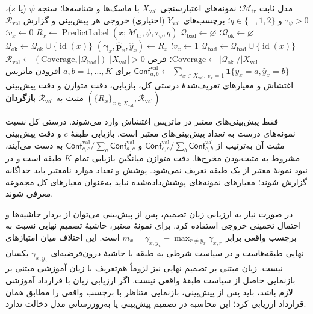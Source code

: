 \begin{algorithm}[!htbp]
\caption{اعتبارسنجی مدل با فراخوانی روند پیش‌بینی برچسب}
\label{cmp:alg:ch3-heldout-validation}
\begin{algorithmic}[1]
\REQUIRE مدل ثابت $\mathcal M_{\mathrm{tr}}$؛
نمونه‌های اعتبارسنجی $X_{\mathrm{val}}$ با ماسک‌ها و شناسه‌ها؛
سنجه $\psi$ (یا $s$)، $\tau_\psi>0$ و $q\in\{\bot,1,2\}$؛
برچسب‌های $Y_{\mathrm{val}}$ (اختیاری)
\ENSURE خروجی هر پیش‌بینی و گزارش $\mathcal R_{\mathrm{val}}$
\STATE $\mathcal Q_{\mathrm{ok}}\gets\varnothing$؛
$\mathcal Q_{\mathrm{bad}}\gets\varnothing$
    \STATE $R_x\gets\operatorname{PredictLabel}
    (x;\mathcal M_{\mathrm{tr}},\psi,\tau_\psi,q)$
        \STATE $v_x\gets0$؛
        $\mathcal Q_{\mathrm{bad}}\gets\mathcal Q_{\mathrm{bad}}\cup\{\operatorname{id}(x)\}$
    \ELSE
        \STATE $v_x\gets1$؛
        $(\boldsymbol\gamma_x,\widehat{\boldsymbol p}_x,\widehat y_x)\gets R_x$
        \STATE $\mathcal Q_{\mathrm{ok}}\gets\mathcal Q_{\mathrm{ok}}\cup\{\operatorname{id}(x)\}$
    \ENDIF
\ENDFOR
\STATE $\mathrm{Coverage}\gets|\mathcal Q_{\mathrm{ok}}|/|X_{\mathrm{val}}|$؛
فرض $|X_{\mathrm{val}}|>0$
\STATE $\mathcal R_{\mathrm{val}}\gets(\mathrm{Coverage},|\mathcal Q_{\mathrm{bad}}|)$
    \STATE $\mathsf{Conf}_{a,b}^{\mathrm{val}}\gets
    \sum_{x\in X_{\mathrm{val}}:\,v_x=1}
    \mathbf1\{y_x=a,\widehat y_x=b\}$
    برای $a,b=1,\ldots,K$
    \STATE افزودن ماتریس اغتشاش و معیارهای تعریف‌شدهٔ
    درستی کل، بازیابی، دقت متوازن و دقت پیش‌بینی مثبت
    به $\mathcal R_{\mathrm{val}}$
\ENDIF
\STATE \textbf{بازگردان} $(\{R_x\}_{x\in X_{\mathrm{val}}},\mathcal R_{\mathrm{val}})$
\end{algorithmic}
\end{algorithm}

فقط پیش‌بینی‌های معتبر در ماتریس اغتشاش وارد می‌شوند.
درستی کل نسبت نمونه‌های درست به تعداد پیش‌بینی‌های
معتبر است. بازیابی طبقهٔ $c$ و دقت پیش‌بینی مثبت آن
به‌ترتیب از
$\mathsf{Conf}_{c,c}^{\mathrm{val}}/\sum_b\mathsf{Conf}_{c,b}^{\mathrm{val}}$
و
$\mathsf{Conf}_{c,c}^{\mathrm{val}}/\sum_a\mathsf{Conf}_{a,c}^{\mathrm{val}}$
به دست می‌آیند، مشروط به مثبت‌بودن مخرج‌ها.
دقت متوازن میانگین بازیابی تمام $K$ طبقه است و
در نبود نمونهٔ معتبر از یک طبقه تعریف نمی‌شود.
پوشش و تعداد موارد نامعتبر باید جداگانه گزارش شوند؛
معیارهای نمونه‌های پوشش‌داده‌شده نباید به‌عنوان
معیارهای کل مجموعه معرفی شوند.

در صورت نیاز به ارزیابی زیان تصمیم، پس از پیش‌بینی
می‌توان از بردار حاشیه‌ها و احتمال تخمینی خروجی
استفاده کرد. برای نمونهٔ معتبر، حاشیهٔ تصمیم نهایی
نسبت به برچسب واقعی برابر
$m_x=\gamma_{x,y_x}-\max_{r\ne y_x}\gamma_{x,r}$
است. این اختلاف میان امتیازهای نهایی طبقه‌هاست
و در سیاست شرطی به طبقه با حاشیهٔ درون‌فرضیه‌ای
$\gamma_{x,y_x}$ یکسان نیست. زیان مبتنی بر تصمیم
نهایی نیز لزوماً هم‌تعریف با زیان آموزشی مبتنی بر
بازنمایی حاصل از سیاست طبقهٔ واقعی نیست.
اگر ارزیابی زیان با قرارداد آموزشی لازم باشد،
باید پس از پیش‌بینی، بازنمایی متناظر با برچسب
واقعی را مطابق همان قرارداد ارزیابی کرد؛ این
محاسبه در تصمیم پیش‌بینی یا به‌روزرسانی مدل
دخالت ندارد.

